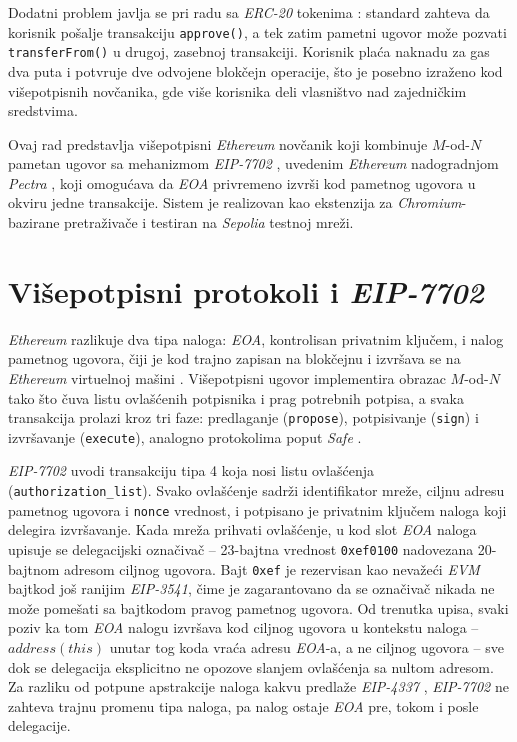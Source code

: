 \documentclass[10pt,a4paper]{article}
\newcommand{\en}[1]{\textit{\textenglish{#1}}}
\begin{document}
Dodatni problem javlja se pri radu sa \en{ERC-20} tokenima \cite{erc20u}: standard zahteva da korisnik po\v salje transakciju \texttt{approve()}, a tek zatim pametni ugovor mo\v ze pozvati \texttt{transferFrom()} u drugoj, zasebnoj transakciji. Korisnik pla\'ca naknadu za gas dva puta i potvr\dj uje dve odvojene blok\v cejn operacije, \v sto je posebno izra\v zeno kod vi\v sepotpisnih nov\v canika, gde vi\v se korisnika deli vlasni\v stvo nad zajedni\v ckim sredstvima.

Ovaj rad predstavlja vi\v sepotpisni \en{Ethereum} nov\v canik koji kombinuje $M$-od-$N$ pametan ugovor sa mehanizmom \en{EIP-7702} \cite{eip7702u}, uvedenim \en{Ethereum} nadogradnjom \en{Pectra} \cite{pectrau}, koji omogu\'cava da \en{EOA} privremeno izvr\v si kod pametnog ugovora u okviru jedne transakcije. Sistem je realizovan kao ekstenzija za \en{Chromium}-bazirane pretra\v ziva\v ce i testiran na \en{Sepolia} testnoj mre\v zi.

\section{Vi\v sepotpisni protokoli i \en{EIP-7702}{}}

\en{Ethereum} razlikuje dva tipa naloga: \en{EOA}, kontrolisan privatnim klju\v cem, i nalog pametnog ugovora, \v ciji je kod trajno zapisan na blok\v cejnu i izvr\v sava se na \en{Ethereum} virtuelnoj ma\v sini \cite{woodu}. Vi\v sepotpisni ugovor implementira obrazac $M$-od-$N$ tako \v sto \v cuva listu ovla\v s\'cenih potpisnika i prag potrebnih potpisa, a svaka transakcija prolazi kroz tri faze: predlaganje (\texttt{propose}), potpisivanje (\texttt{sign}) i izvr\v savanje (\texttt{execute}), analogno protokolima poput \en{Safe} \cite{safeu}.

\en{EIP-7702} \cite{eip7702u} uvodi transakciju tipa 4 koja nosi listu ovla\v s\'cenja (\texttt{authorization\_list}). Svako ovla\v s\'cenje sadr\v zi identifikator mre\v ze, ciljnu adresu pametnog ugovora i \texttt{nonce} vrednost, i potpisano je privatnim klju\v cem naloga koji delegira izvr\v savanje. Kada mre\v za prihvati ovla\v s\'cenje, u kod slot \en{EOA} naloga upisuje se delegacijski ozna\v civa\v c -- 23-bajtna vrednost \texttt{0xef0100} nadovezana 20-bajtnom adresom ciljnog ugovora. Bajt \texttt{0xef} je rezervisan kao neva\v ze\'ci \en{EVM} bajtkod jo\v s ranijim \en{EIP-3541}, \v cime je zagarantovano da se ozna\v civa\v c nikada ne mo\v ze pome\v sati sa bajtkodom pravog pametnog ugovora. Od trenutka upisa, svaki poziv ka tom \en{EOA} nalogu izvr\v sava kod ciljnog ugovora u kontekstu naloga -- $address(this)$ unutar tog koda vra\'ca adresu \en{EOA}-a, a ne ciljnog ugovora -- sve dok se delegacija eksplicitno ne opozove slanjem ovla\v s\'cenja sa nultom adresom. Za razliku od potpune apstrakcije naloga kakvu predla\v ze \en{EIP-4337} \cite{eip4337u}, \en{EIP-7702} ne zahteva trajnu promenu tipa naloga, pa nalog ostaje \en{EOA} pre, tokom i posle delegacije.
\end{document}

